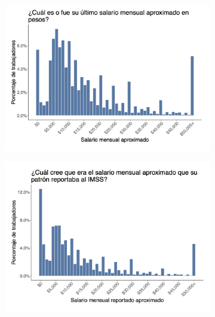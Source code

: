 \documentclass[oneside,11pt]{article}
\begin{document}
\begin{figure}[H]
    \caption{Worker Survey Graphs}
    \label{worker_surver_2}
    \begin{center}

    \begin{subfigure}{0.49\textwidth}
    \includegraphics[width=\textwidth]{04_Figures/workey_survey/Exp_7.png}
    \end{subfigure}
    \begin{subfigure}{0.49\textwidth}
    \includegraphics[width=\textwidth]{04_Figures/workey_survey/Exp_8.png}
    \end{subfigure}
    

\end{center}
\end{figure}
\end{document}
